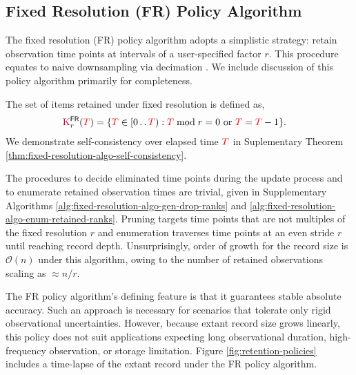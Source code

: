 \subsection{Fixed Resolution (FR) Policy Algorithm}
\label{sec:fixed-resolution-algo}

The fixed resolution (FR) policy algorithm adopts a simplistic strategy: retain observation time points at intervals of a user-specified factor $r$.
This procedure equates to naive downsampling via decimation \citep[p. 31]{crochiere1983multirate}.
We include discussion of this policy algorithm primarily for completeness.

The set of items retained under fixed resolution is defined as,
\begin{align}
\colorK^{\mathsf{FR}}_r(\colorT)
&= \{
\colorTbar \in [0\twodots\colorT)
: \colorTbar \bmod r = 0 \text{ or } \colorTbar = \colorT - 1
\}.
\label{eqn:fr_kept}
\end{align}
We demonstrate self-consistency over elapsed time $\colorT$ in Suplementary Theorem \ref{thm:fixed-resolution-algo-self-consistency}.

The procedures to decide eliminated time points during the update process and to enumerate retained observation times are trivial, given in Supplementary Algorithms \ref{alg:fixed-resolution-algo-gen-drop-ranks} and \ref{alg:fixed-resolution-algo-enum-retained-ranks}.
Pruning targets time points that are not multiples of the fixed resolution $r$ and enumeration traverses time points at an even stride $r$ until reaching record depth.
Unsurprisingly, order of growth for the record size is $\mathcal{O}(n)$ under this algorithm, owing to the number of retained observations scaling as $\approx n / r$.




% 
% 

The FR policy algorithm's defining feature is that it guarantees stable absolute accuracy.
Such an approach is necessary for scenarios that tolerate only rigid observational uncertainties.
However, because extant record size grows linearly, this policy does not suit applications expecting long observational duration, high-frequency observation, or storage limitation.
Figure \ref{fig:retention-policies} includes a time-lapse of the extant record under the FR policy algorithm.
